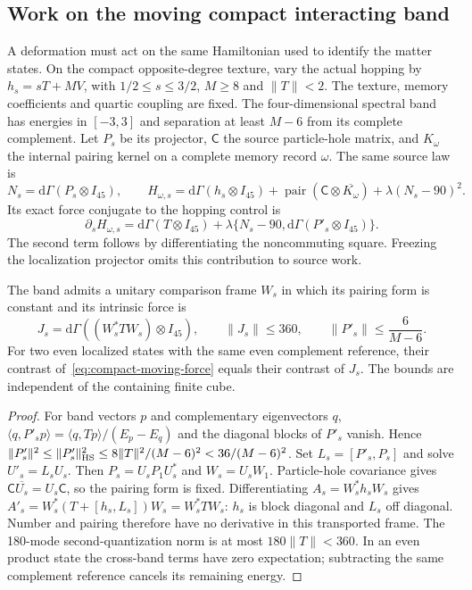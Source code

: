 \subsection{Work on the moving compact interacting band}
\label{sec:compact-band-work}

A deformation must act on the same Hamiltonian used to identify the matter
states. On the compact opposite-degree texture, vary the actual hopping by
$h_s=sT+MV$, with $1/2\leq s\leq3/2$, $M\geq8$ and
$\|T\|<2$. The texture, memory coefficients and quartic coupling are fixed.
The four-dimensional spectral band has energies in $[-3,3]$ and separation
at least $M-6$ from its complete complement. Let $P_s$ be its projector,
$\mathsf C$ the source particle-hole matrix, and $K_\omega$ the internal
pairing kernel on a complete memory record $\omega$. The same source law is
\[
 N_s=\mathrm d\Gamma(P_s\otimes I_{45}),\qquad
 H_{\omega,s}=\mathrm d\Gamma(h_s\otimes I_{45})
 +\operatorname{pair}(\mathsf C\otimes\overline{K_\omega})
 +\lambda(N_s-90)^2.
\]
Its exact force conjugate to the hopping control is
\begin{equation}
 \partial_s H_{\omega,s}=\mathrm d\Gamma(T\otimes I_{45})
 +\lambda\{N_s-90,\mathrm d\Gamma(P'_s\otimes I_{45})\}.
 \label{eq:compact-moving-force}
\end{equation}
The second term follows by differentiating the noncommuting square.
Freezing the localization projector omits this contribution to source work.

\begin{proposition}
The band admits a unitary comparison frame $W_s$ in which its pairing form
is constant and its intrinsic force is
\[
 J_s=\mathrm d\Gamma((W_s^*TW_s)\otimes I_{45}),\qquad
 \|J_s\|\leq360,\qquad \|P'_s\|\leq\frac6{M-6}.
\]
For two even localized states with the same even complement reference,
their contrast of~\eqref{eq:compact-moving-force} equals their contrast
of $J_s$. The bounds are independent of the containing finite cube.
\end{proposition}
\begin{proof}
For band vectors $p$ and complementary eigenvectors $q$,
$\langle q,P'_sp\rangle=\langle q,Tp\rangle/(E_p-E_q)$ and the
diagonal blocks of $P'_s$ vanish. Hence
$\|P'_s\|^2\leq\|P'_s\|_{\rm HS}^2
\leq8\|T\|^2/(M-6)^2<36/(M-6)^2$.
Set $L_s=[P'_s,P_s]$ and solve $U'_s=L_sU_s$. Then
$P_s=U_sP_1U_s^*$ and $W_s=U_sW_1$.
Particle-hole covariance gives
$\mathsf C\overline{U_s}=U_s\mathsf C$, so the pairing form is fixed.
Differentiating $A_s=W_s^*h_sW_s$ gives
$A'_s=W_s^*(T+[h_s,L_s])W_s=W_s^*TW_s$:
$h_s$ is block diagonal and $L_s$ off diagonal.
Number and pairing therefore have no derivative in this transported frame.
The 180-mode second-quantization norm is at most $180\|T\|<360$.
In an even product state the cross-band terms have zero expectation;
subtracting the same complement reference cancels its remaining energy.
\end{proof}

